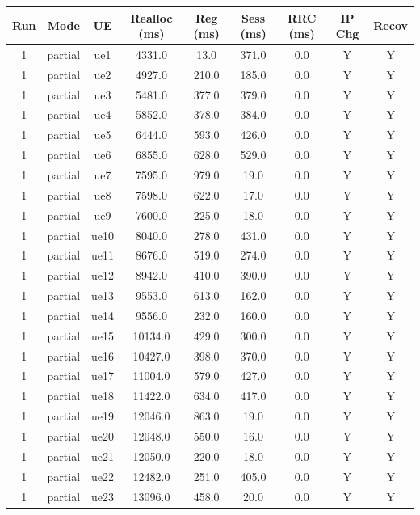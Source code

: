 \begin{table}[ht]
\centering
\begin{tabular}{|c|c|c|c|c|c|c|c|c|}
\hline
Run & Mode & UE & Realloc (ms) & Reg (ms) & Sess (ms) & RRC (ms) & IP Chg & Recov \\
\hline
1 & partial & ue1 & 4331.0 & 13.0 & 371.0 & 0.0 & Y & Y \\
1 & partial & ue2 & 4927.0 & 210.0 & 185.0 & 0.0 & Y & Y \\
1 & partial & ue3 & 5481.0 & 377.0 & 379.0 & 0.0 & Y & Y \\
1 & partial & ue4 & 5852.0 & 378.0 & 384.0 & 0.0 & Y & Y \\
1 & partial & ue5 & 6444.0 & 593.0 & 426.0 & 0.0 & Y & Y \\
1 & partial & ue6 & 6855.0 & 628.0 & 529.0 & 0.0 & Y & Y \\
1 & partial & ue7 & 7595.0 & 979.0 & 19.0 & 0.0 & Y & Y \\
1 & partial & ue8 & 7598.0 & 622.0 & 17.0 & 0.0 & Y & Y \\
1 & partial & ue9 & 7600.0 & 225.0 & 18.0 & 0.0 & Y & Y \\
1 & partial & ue10 & 8040.0 & 278.0 & 431.0 & 0.0 & Y & Y \\
1 & partial & ue11 & 8676.0 & 519.0 & 274.0 & 0.0 & Y & Y \\
1 & partial & ue12 & 8942.0 & 410.0 & 390.0 & 0.0 & Y & Y \\
1 & partial & ue13 & 9553.0 & 613.0 & 162.0 & 0.0 & Y & Y \\
1 & partial & ue14 & 9556.0 & 232.0 & 160.0 & 0.0 & Y & Y \\
1 & partial & ue15 & 10134.0 & 429.0 & 300.0 & 0.0 & Y & Y \\
1 & partial & ue16 & 10427.0 & 398.0 & 370.0 & 0.0 & Y & Y \\
1 & partial & ue17 & 11004.0 & 579.0 & 427.0 & 0.0 & Y & Y \\
1 & partial & ue18 & 11422.0 & 634.0 & 417.0 & 0.0 & Y & Y \\
1 & partial & ue19 & 12046.0 & 863.0 & 19.0 & 0.0 & Y & Y \\
1 & partial & ue20 & 12048.0 & 550.0 & 16.0 & 0.0 & Y & Y \\
1 & partial & ue21 & 12050.0 & 220.0 & 18.0 & 0.0 & Y & Y \\
1 & partial & ue22 & 12482.0 & 251.0 & 405.0 & 0.0 & Y & Y \\
1 & partial & ue23 & 13096.0 & 458.0 & 20.0 & 0.0 & Y & Y \\

\end{tabular}
\end{table}
